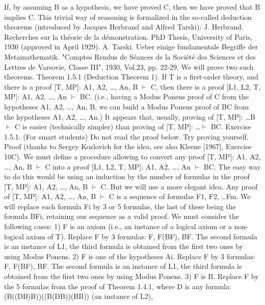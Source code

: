 If, by assuming B as a hypothesis, we have proved C, then we have proved that B implies C. This trivial
way of reasoning is formalized in the so-called deduction theorems (introduced by Jacques Herbrand
and Alfred Tarski):
J. Herbrand. Recherches sur la théorie de la démonstration. PhD Thesis, University of Paris, 1930 (approved in April 1929).
A. Tarski. Ueber einige fundamentale Begriffe der Metamathematik. "Comptes Rendus de Séances de la Société des Sciences
et des Lettres de Varsovie, Classe III", 1930, Vol.23, pp. 22-29.
We will prove two such theorems.
Theorem 1.5.1 (Deduction Theorem 1). If T is a first-order theory, and there is a proof [T, MP]: A1,
A2, \ldots , An, B \(\vdash\) C, then there is a proof [L1, L2, T, MP]: A1, A2, \ldots , An \(\vdash\) B\IMPLIES C. (i.e., having a Modus
Ponens proof of C from the hypotheses A1, A2, \ldots , An, B, we can build a Modus Ponens proof of B\IMPLIES C
from the hypotheses A1, A2, \ldots , An.)
It appears that, usually, proving of [T, MP]: \ldots  B \(\vdash\) C is easier (technically simpler) than proving of [T,
MP]: \ldots  \(\vdash\) B\IMPLIES C.
Exercise 1.5.1. (For smart students) Do not read the proof below. Try proving yourself.
Proof (thanks to Sergey Kozlovich for the idea, see also Kleene [1967], Exercise 10C). We must define a
procedure allowing to convert any proof [T, MP]: A1, A2, \ldots , An, B \(\vdash\) C into a proof [L1, L2, T, MP]: A1,
A2, \ldots , An \(\vdash\) B\IMPLIES C.
The easy way to do this would be using an induction by the number of formulas in the proof [T, MP]: A1,
A2, \ldots , An, B \(\vdash\) C. But we will use a more elegant idea. Any proof of [T, MP]: A1, A2, \ldots , An, B \(\vdash\) C is a
sequence of formulas F1, F2, \ldots Fm. We will replace each formula Fi by 3 or 5 formulas, the last of these
being the formula B\IMPLIES Fi, retaining our sequence as a valid proof.
We must consider the following cases:
1) F is an axiom (i.e., an instance of a logical axiom or a non-logical axiom of T). Replace F by 3
formulas: F, F\IMPLIES (B\IMPLIES F), B\IMPLIES F. The second formula is an instance of L1, the third formula is obtained
from the first two ones by using Modus Ponens.
2) F is one of the hypotheses Ai. Replace F by 3 formulas: F, F\IMPLIES (B\IMPLIES F), B\IMPLIES F. The second formula is an
instance of L1, the third formula is obtained from the first two ones by using Modus Ponens.
3) F is B. Replace F by the 5 formulas from the proof of Theorem 1.4.1, where D is any formula:
(B\IMPLIES ((D\IMPLIES B)\IMPLIES B))\IMPLIES ((B\IMPLIES (D\IMPLIES B))\IMPLIES (B\IMPLIES B)) (an instance of L2),
